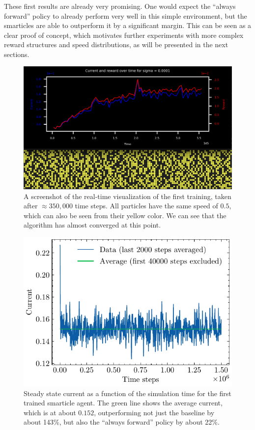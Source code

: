 These first results are already very promising. One would expect the \enquote{always forward} policy to already perform very well in this simple environment, but the smarticles are able to outperform it by a significant margin. This can be seen as a clear proof of concept, which motivates further experiments with more complex reward structures and speed distributions, as will be presented in the next sections.
\begin{figure}[H]
    \centering
    \includegraphics[width=\textwidth]{first_training_screenshot.png}
    \caption{A screenshot of the real-time visualization of the first training, taken after $\approx 350,000$ time steps. All particles have the same speed of $0.5$, which can also be seen from their yellow color. We can see that the algorithm has almost converged at this point.}
    \label{fig:first_training_screenshot}
\end{figure}

\begin{figure}[H]
    \centering
    \includegraphics{equal_speeds.pdf}
    \caption{Steady state current as a function of the simulation time for the first trained smarticle agent. The green line shows the average current, which is at about $0.152$, outperforming not just the baseline by about 143\%, but also the \enquote{always forward} policy by about 22\%.}
    \label{fig:equal_speeds}
\end{figure}

